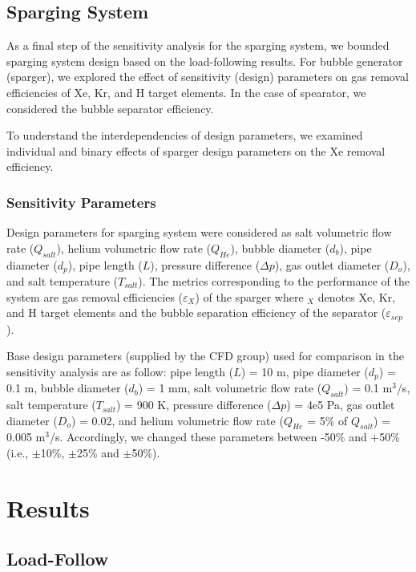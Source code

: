 \subsection{Sparging System}

    As a final step of the sensitivity analysis for the sparging system, we bounded sparging system design based on the load-following results. For bubble generator (sparger), we explored the effect of sensitivity (design) parameters on gas removal efficiencies of Xe, Kr, and H target elements. In the case of spearator, we considered the bubble separator efficiency.

    To understand the interdependencies of design parameters, we examined individual and binary effects of sparger design parameters on the Xe removal efficiency.

\subsubsection{Sensitivity Parameters}

    Design parameters for sparging system were considered as salt volumetric flow rate ($Q_{salt}$), helium volumetric flow rate ($Q_{He}$), bubble diameter ($d_b$), pipe diameter ($d_p$), pipe length ($L$), pressure difference ($\Delta p$), gas outlet diameter ($D_o$), and salt temperature ($T_{salt}$). The metrics corresponding to the performance of the system are gas removal efficiencies ($\varepsilon$$_{X}$) of the sparger where $_{X}$ denotes Xe, Kr, and H target elements and the bubble separation efficiency of the separator ($\varepsilon$$_{sep}$).

    Base design parameters (supplied by the CFD group) used for comparison in the sensitivity analysis are as follow: pipe length ($L$) = 10 m, pipe diameter ($d_p$) = 0.1 m, bubble diameter ($d_b$) = 1 mm, salt volumetric flow rate ($Q_{salt}$) = 0.1 m$^{3}$/s, salt temperature ($T_{salt}$) = 900 K, pressure difference ($\Delta p$) = 4e5 Pa, gas outlet diameter ($D_o$) = 0.02, and helium volumetric flow rate ($Q_{He}$ = 5\% of $Q_{salt}$) = 0.005 m$^{3}$/s. Accordingly, we changed these parameters between -50\% and +50\% (i.e., $\pm$10\%, $\pm$25\% and $\pm$50\%).

\newpage
\FloatBarrier

\section{Results}

\subsection{Load-Follow}

